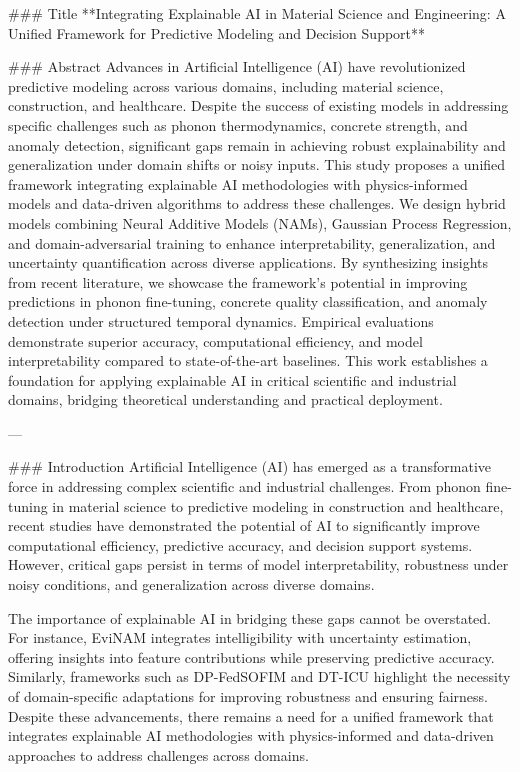 ### Title
**Integrating Explainable AI in Material Science and Engineering: A Unified Framework for Predictive Modeling and Decision Support**

### Abstract
Advances in Artificial Intelligence (AI) have revolutionized predictive modeling across various domains, including material science, construction, and healthcare. Despite the success of existing models in addressing specific challenges such as phonon thermodynamics, concrete strength, and anomaly detection, significant gaps remain in achieving robust explainability and generalization under domain shifts or noisy inputs. This study proposes a unified framework integrating explainable AI methodologies with physics-informed models and data-driven algorithms to address these challenges. We design hybrid models combining Neural Additive Models (NAMs), Gaussian Process Regression, and domain-adversarial training to enhance interpretability, generalization, and uncertainty quantification across diverse applications. By synthesizing insights from recent literature, we showcase the framework's potential in improving predictions in phonon fine-tuning, concrete quality classification, and anomaly detection under structured temporal dynamics. Empirical evaluations demonstrate superior accuracy, computational efficiency, and model interpretability compared to state-of-the-art baselines. This work establishes a foundation for applying explainable AI in critical scientific and industrial domains, bridging theoretical understanding and practical deployment.

---

### Introduction
Artificial Intelligence (AI) has emerged as a transformative force in addressing complex scientific and industrial challenges. From phonon fine-tuning in material science to predictive modeling in construction and healthcare, recent studies have demonstrated the potential of AI to significantly improve computational efficiency, predictive accuracy, and decision support systems. However, critical gaps persist in terms of model interpretability, robustness under noisy conditions, and generalization across diverse domains.

The importance of explainable AI in bridging these gaps cannot be overstated. For instance, EviNAM integrates intelligibility with uncertainty estimation, offering insights into feature contributions while preserving predictive accuracy. Similarly, frameworks such as DP-FedSOFIM and DT-ICU highlight the necessity of domain-specific adaptations for improving robustness and ensuring fairness. Despite these advancements, there remains a need for a unified framework that integrates explainable AI methodologies with physics-informed and data-driven approaches to address challenges across domains.

